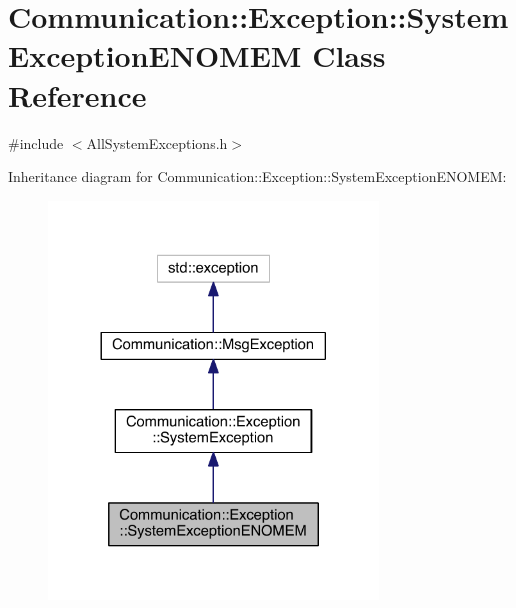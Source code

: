 \hypertarget{class_communication_1_1_exception_1_1_system_exception_e_n_o_m_e_m}{}\section{Communication\+:\+:Exception\+:\+:System\+Exception\+E\+N\+O\+M\+E\+M Class Reference}
\label{class_communication_1_1_exception_1_1_system_exception_e_n_o_m_e_m}


{\ttfamily \#include $<$All\+System\+Exceptions.\+h$>$}



Inheritance diagram for Communication\+:\+:Exception\+:\+:System\+Exception\+E\+N\+O\+M\+E\+M\+:\nopagebreak
\begin{figure}[H]
\begin{center}
\leavevmode
\includegraphics[width=248pt]{class_communication_1_1_exception_1_1_system_exception_e_n_o_m_e_m__inherit__graph}
\end{center}
\end{figure}


